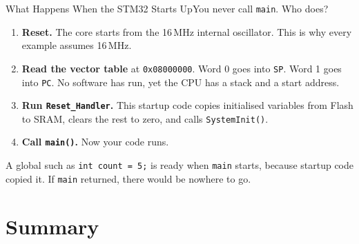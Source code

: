 \documentclass[9pt,aspectratio=169,xcolor=table]{beamer}
\begin{document}
\begin{frame}{What Happens When the STM32 Starts Up}{You never call \texttt{main}. Who does?}
    \leavevmode
    \begin{center}
    \end{center}

    \vspace{1mm}
    {\small
    \begin{enumerate}\itemsep2pt
        \item \textbf{Reset.} The core starts from the 16\,MHz internal oscillator. This is why every example assumes 16\,MHz.
        \item \textbf{Read the vector table} at \texttt{0x08000000}. Word 0 goes into \texttt{SP}. Word 1 goes into \texttt{PC}. No software has run, yet the CPU has a stack and a start address.
        \item \textbf{Run \texttt{Reset\_Handler}.} This startup code copies initialised variables from Flash to SRAM, clears the rest to zero, and calls \texttt{SystemInit()}.
        \item \textbf{Call \texttt{main()}.} Now your code runs.
    \end{enumerate}}

    \vspace{1mm}
    {\small A global such as \texttt{int count = 5;} is ready when \texttt{main} starts, because startup code copied it. If \texttt{main} returned, there would be nowhere to go.}
\end{frame}


\section{Summary}
\end{document}
